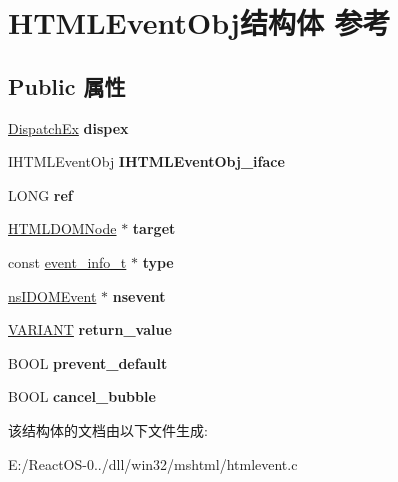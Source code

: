 \hypertarget{struct_h_t_m_l_event_obj}{}\section{H\+T\+M\+L\+Event\+Obj结构体 参考}
\label{struct_h_t_m_l_event_obj}
\subsection*{Public 属性}
\begin{DoxyCompactItemize}
\item 
\mbox{\label{struct_h_t_m_l_event_obj_acd4b5293fe4b52647aa604b2e3928954}} 
\hyperlink{struct_dispatch_ex}{Dispatch\+Ex} {\bfseries dispex}
\item 
\mbox{\label{struct_h_t_m_l_event_obj_aac059e97ae51a21fc66797368c850d4b}} 
I\+H\+T\+M\+L\+Event\+Obj {\bfseries I\+H\+T\+M\+L\+Event\+Obj\+\_\+iface}
\item 
\mbox{\label{struct_h_t_m_l_event_obj_ae6ea361cbdfbd855e7450fbc87c2988e}} 
L\+O\+NG {\bfseries ref}
\item 
\mbox{\label{struct_h_t_m_l_event_obj_a2fef7a3445dc4c9c61db23ea7d684079}} 
\hyperlink{struct_h_t_m_l_d_o_m_node}{H\+T\+M\+L\+D\+O\+M\+Node} $\ast$ {\bfseries target}
\item 
\mbox{\label{struct_h_t_m_l_event_obj_a394ae8b50a84fc68ed9caa6490253dba}} 
const \hyperlink{structevent__info__t}{event\+\_\+info\+\_\+t} $\ast$ {\bfseries type}
\item 
\mbox{\label{struct_h_t_m_l_event_obj_a70331ae934b65c97533aaea95bfefa28}} 
\hyperlink{interfacens_i_d_o_m_event}{ns\+I\+D\+O\+M\+Event} $\ast$ {\bfseries nsevent}
\item 
\mbox{\label{struct_h_t_m_l_event_obj_a99be6a4d74eb5afbc35246ecc18a8e83}} 
\hyperlink{structtag_v_a_r_i_a_n_t}{V\+A\+R\+I\+A\+NT} {\bfseries return\+\_\+value}
\item 
\mbox{\label{struct_h_t_m_l_event_obj_ae3be27e724dfb0ae11eb82fee182d5c8}} 
B\+O\+OL {\bfseries prevent\+\_\+default}
\item 
\mbox{\label{struct_h_t_m_l_event_obj_aaf4076d7d50cf35b48b9970185430879}} 
B\+O\+OL {\bfseries cancel\+\_\+bubble}
\end{DoxyCompactItemize}


该结构体的文档由以下文件生成\+:\begin{DoxyCompactItemize}
\item 
E\+:/\+React\+O\+S-\/0../dll/win32/mshtml/htmlevent.\+c\end{DoxyCompactItemize}
